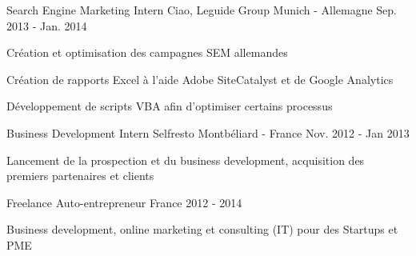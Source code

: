 \begin{cventries}
  \cventry
    {Search Engine Marketing Intern} %
    {Ciao, Leguide Group} %
    {Munich - Allemagne} %
    {Sep. 2013 - Jan. 2014} %
    {
      \begin{cvitems} %
        \item {Création et optimisation des campagnes SEM allemandes}
        \item {Création de rapports Excel à l'aide Adobe SiteCatalyst et de Google Analytics}
        \item {Développement de scripts VBA afin d'optimiser certains processus}
      \end{cvitems}
    }
	\cventry
	{Business Development Intern} %
	{Selfresto} %
	{Montbéliard - France} %
	{Nov. 2012 - Jan 2013} %
	{
		\begin{cvitems} %
			\item {Lancement de la prospection et du business development, acquisition des premiers partenaires et clients}
		\end{cvitems}
	}
  \cventry
    {Freelance} %
    {Auto-entrepreneur} %
    {France} %
    {2012 - 2014} %
    {	
      \begin{cvitems} %
      	\item{Business development, online marketing et consulting (IT) pour des Startups et PME}
      \end{cvitems}
    }




\end{cventries}
